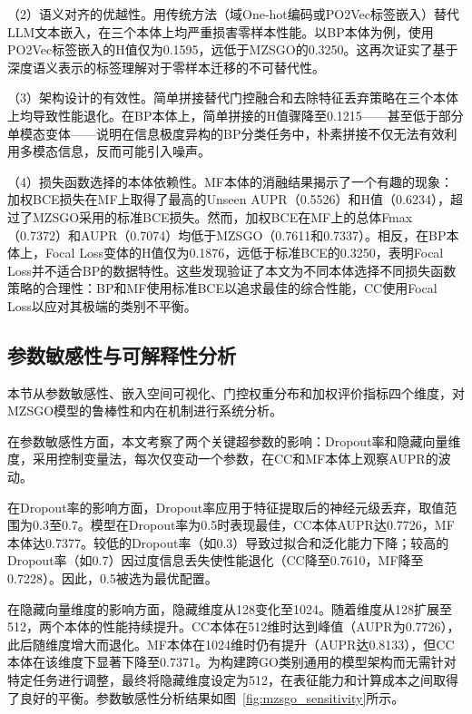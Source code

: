 （2）语义对齐的优越性。用传统方法（域One-hot编码或PO2Vec标签嵌入）替代LLM文本嵌入，在三个本体上均严重损害零样本性能。以BP本体为例，使用PO2Vec标签嵌入的H值仅为0.1595，远低于MZSGO的0.3250。这再次证实了基于深度语义表示的标签理解对于零样本迁移的不可替代性。

（3）架构设计的有效性。简单拼接替代门控融合和去除特征丢弃策略在三个本体上均导致性能退化。在BP本体上，简单拼接的H值骤降至0.1215——甚至低于部分单模态变体——说明在信息极度异构的BP分类任务中，朴素拼接不仅无法有效利用多模态信息，反而可能引入噪声。

（4）损失函数选择的本体依赖性。MF本体的消融结果揭示了一个有趣的现象：加权BCE损失在MF上取得了最高的Unseen AUPR（0.5526）和H值（0.6234），超过了MZSGO采用的标准BCE损失。然而，加权BCE在MF上的总体Fmax（0.7372）和AUPR（0.7074）均低于MZSGO（0.7611和0.7337）。相反，在BP本体上，Focal Loss变体的H值仅为0.1876，远低于标准BCE的0.3250，表明Focal Loss并不适合BP的数据特性。这些发现验证了本文为不同本体选择不同损失函数策略的合理性：BP和MF使用标准BCE以追求最佳的综合性能，CC使用Focal Loss以应对其极端的类别不平衡。

\subsection{参数敏感性与可解释性分析}

本节从参数敏感性、嵌入空间可视化、门控权重分布和加权评价指标四个维度，对MZSGO模型的鲁棒性和内在机制进行系统分析。

在参数敏感性方面，本文考察了两个关键超参数的影响：Dropout率和隐藏向量维度，采用控制变量法，每次仅变动一个参数，在CC和MF本体上观察AUPR的波动。

在Dropout率的影响方面，Dropout率应用于特征提取后的神经元级丢弃，取值范围为0.3至0.7。模型在Dropout率为0.5时表现最佳，CC本体AUPR达0.7726，MF本体达0.7377。较低的Dropout率（如0.3）导致过拟合和泛化能力下降；较高的Dropout率（如0.7）因过度信息丢失使性能退化（CC降至0.7610，MF降至0.7228）。因此，0.5被选为最优配置。

在隐藏向量维度的影响方面，隐藏维度从128变化至1024。随着维度从128扩展至512，两个本体的性能持续提升。CC本体在512维时达到峰值（AUPR为0.7726），此后随维度增大而退化。MF本体在1024维时仍有提升（AUPR达0.8133），但CC本体在该维度下显著下降至0.7371。为构建跨GO类别通用的模型架构而无需针对特定任务进行调整，最终将隐藏维度设定为512，在表征能力和计算成本之间取得了良好的平衡。参数敏感性分析结果如图~\ref{fig:mzsgo_sensitivity}所示。

